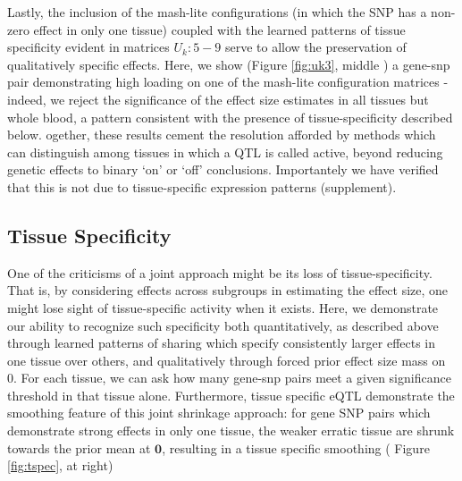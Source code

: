 
Lastly, the inclusion of the mash-lite configurations (in which the SNP has a non-zero effect in only one tissue) coupled with the learned patterns of tissue specificity evident in matrices $U_{k}: 5-9$ serve to allow the preservation of qualitatively specific effects. Here, we show (Figure \ref{fig:uk3}, middle ) a gene-snp pair demonstrating high loading on one of the mash-lite configuration matrices - indeed, we reject the significance of the effect size estimates in all tissues but whole blood,  a pattern consistent with the presence of tissue-specificity described below. ogether, these results cement the resolution afforded by methods which can distinguish among tissues in which a QTL is called active, beyond reducing genetic effects to binary `on' or `off' conclusions. Importantely we have verified that this is not due to tissue-specific expression patterns (supplement). %


\subsection{Tissue Specificity}

One of the criticisms of a joint approach might be its loss of tissue-specificity. That is, by considering effects across subgroups in estimating the effect size, one might lose sight of tissue-specific activity when it exists. Here, we demonstrate our ability to recognize such specificity both quantitatively, as described above through learned patterns of sharing which specify consistently larger effects in one tissue over others, and qualitatively through forced prior effect size mass on 0.  For each tissue, we can ask how many gene-snp pairs meet a given significance threshold in that tissue alone. Furthermore, tissue specific eQTL demonstrate the smoothing feature of this joint shrinkage approach: for gene SNP pairs which demonstrate strong effects in only one tissue, the weaker erratic tissue are shrunk towards the prior mean at $\bm{0}$, resulting in a tissue specific smoothing ( Figure \ref{fig:tspec}, at right) \newline


